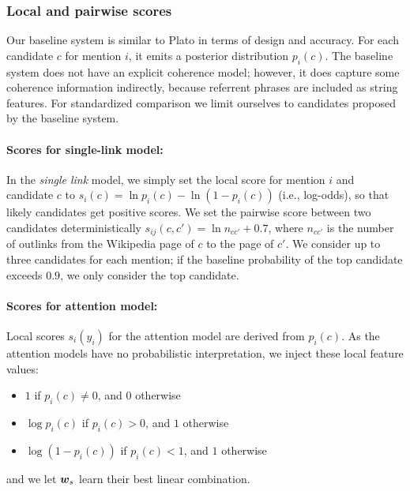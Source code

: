 \subsubsection{Local and pairwise scores}
\label{sec:expt:features}

Our baseline system is similar to Plato \cite{Lazic2015} in terms of
design and accuracy.  For each candidate $c$ for mention $i$, it emits
a posterior distribution $p_i(c)$.  The baseline system does not have
an explicit coherence model; however, it does capture some coherence
information indirectly, because referrent phrases are included as
string features.  For standardized comparison we limit ourselves to
candidates proposed by the baseline system.

\paragraph*{Scores for single-link model:}
In the \emph{single link} model, we simply set the local score for
mention $i$ and candidate $c$ to $s_i(c) = \ln p_i(c) - \ln (1 -
p_i(c))$ (i.e., log-odds), so that likely candidates get positive
scores.  We set the pairwise score between two candidates deterministically
$s_{ij}(c, c') = \ln n_{cc'} + 0.7$, where $n_{cc'}$ is the number of
outlinks from the Wikipedia page of $c$ to the page of $c'$.  We
consider up to three candidates for each mention; if the baseline
probability of the top candidate exceeds $0.9$, we only consider the top
candidate.

\paragraph*{Scores for attention model:}
Local scores $s_i(y_i)$ for the attention model are derived from
$p_i(c)$.  As the attention models have no probabilistic
interpretation, we inject these local feature values:
\begin{itemize}
\item $1$ if $p_i(c)\ne 0$, and 0 otherwise
\item $\log p_i(c)$ if $p_i(c)>0$, and $1$ otherwise
\item $\log(1-p_i(c))$ if $p_i(c)<1$, and $1$ otherwise
\end{itemize}
and we let $\boldsymbol{w}_s$ learn their best linear combination.  



